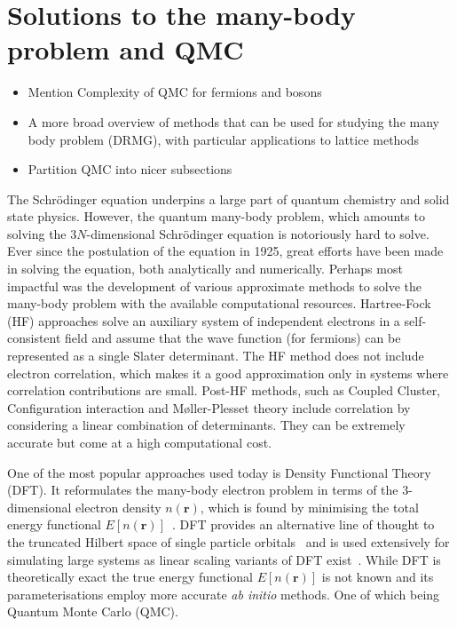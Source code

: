 \newpage
\section{Solutions to the many-body problem and QMC}
\label{sec:qmc}

\begin{itemize}
	\item Mention Complexity of QMC for fermions and bosons
	\item A more broad overview of methods that can be used for studying the many body problem (DRMG), with particular applications to lattice methods
	\item Partition QMC into nicer subsections
\end{itemize}

The Schr{\"o}dinger equation underpins a large part of quantum chemistry and solid state physics. However, the quantum many-body problem, which amounts to solving the $3N$-dimensional Schr\"odinger equation is notoriously hard to solve. Ever since the postulation of the equation in 1925, great efforts have been made in solving the equation, both analytically and numerically. Perhaps most impactful was the development of various approximate methods to solve the many-body problem with the available computational resources. Hartree-Fock (HF) approaches solve an auxiliary system of independent electrons in a self-consistent field and assume that the wave function (for fermions) can be represented as a single Slater determinant. The HF method does not include electron correlation, which makes it a good approximation only in systems where correlation contributions are small. Post-HF methods, such as Coupled Cluster, Configuration interaction and M\o ller-Plesset theory include correlation by considering a linear combination of determinants. They can be extremely accurate but come at a high computational cost. 

One of the most popular approaches used today is Density Functional Theory (DFT). It reformulates the many-body electron problem in terms of the $3$-dimensional electron density $n(\mathbf{r})$, which is found by minimising the total energy functional $E[n(\mathbf{r})]$~\cite{hohenberg1964inhomogeneous}. DFT provides an alternative line of thought to the truncated Hilbert space of single particle orbitals~\cite{kohn1999nobel} and is used extensively for simulating large systems as linear scaling variants of DFT exist~\cite{skylaris2005introducing}. 
While DFT is theoretically exact the true energy functional $E[n(\mathbf{r})]$ is not known and its parameterisations employ more accurate \emph{ab initio} methods. One of which being Quantum Monte Carlo (QMC).

